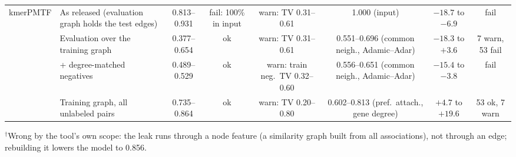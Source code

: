 \begin{table}[h!]
{\begin{tabular}{llcccccc}
\hline
kmerPMTF & As released (evaluation graph holds the test edges) & 0.813--0.931 & fail: 100\% in input & warn: TV 0.31--0.61 & 1.000 (input) & $-18.7$ to $-6.9$ & fail \\
 & Evaluation over the training graph & 0.377--0.654 & ok & warn: TV 0.31--0.61 & 0.551--0.696 (common neigh., Adamic--Adar) & $-18.3$ to $+3.6$ & 7 warn, 53 fail \\
 & + degree-matched negatives & 0.489--0.529 & ok & warn: train neg.\ TV 0.32--0.60 & 0.556--0.651 (common neigh., Adamic--Adar) & $-15.4$ to $-3.8$ & fail \\
 & Training graph, all unlabeled pairs & 0.735--0.864 & ok & warn: TV 0.20--0.80 & 0.602--0.813 (pref.\ attach., gene degree) & $+4.7$ to $+19.6$ & 53 ok, 7 warn \\
\hline
\end{tabular}
}

\medskip\par $^{\dagger}$Wrong by the tool's own scope: the leak runs through a node feature (a similarity graph built from all associations), not through an edge; rebuilding it lowers the model to 0.856.
\end{table}
